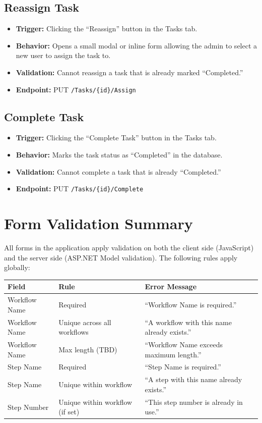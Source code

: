 \documentclass[12pt]{article}
\begin{document}
\subsection{Reassign Task}
\begin{itemize}
    \item \textbf{Trigger:} Clicking the ``Reassign'' button in the Tasks tab.
    \item \textbf{Behavior:} Opens a small modal or inline form allowing the admin to select
    a new user to assign the task to.
    \item \textbf{Validation:} Cannot reassign a task that is already marked ``Completed.''
    \item \textbf{Endpoint:} PUT \texttt{/Tasks/\{id\}/Assign}
\end{itemize}

\subsection{Complete Task}
\begin{itemize}
    \item \textbf{Trigger:} Clicking the ``Complete Task'' button in the Tasks tab.
    \item \textbf{Behavior:} Marks the task status as ``Completed'' in the database.
    \item \textbf{Validation:} Cannot complete a task that is already ``Completed.''
    \item \textbf{Endpoint:} PUT \texttt{/Tasks/\{id\}/Complete}
\end{itemize}

\section{Form Validation Summary}

All forms in the application apply validation on both the client side (JavaScript) and the
server side (ASP.NET Model validation). The following rules apply globally:

\begin{center}
\begin{tabular}{lll}
\toprule
Field & Rule & Error Message \\
\midrule
Workflow Name    & Required                        & ``Workflow Name is required.'' \\
Workflow Name    & Unique across all workflows     & ``A workflow with this name already exists.'' \\
Workflow Name    & Max length (TBD)                & ``Workflow Name exceeds maximum length.'' \\
Step Name        & Required                        & ``Step Name is required.'' \\
Step Name        & Unique within workflow          & ``A step with this name already exists.'' \\
Step Number      & Unique within workflow (if set) & ``This step number is already in use.'' \\
\bottomrule
\end{tabular}
\end{center}
\end{document}
